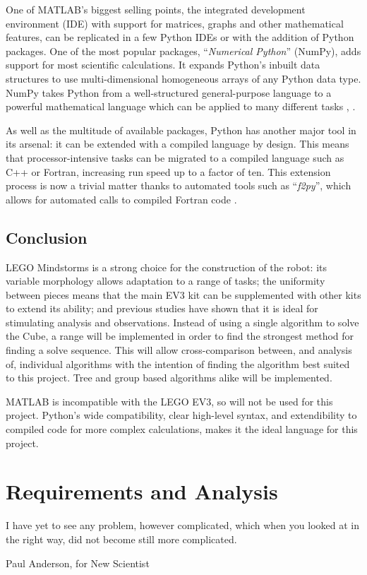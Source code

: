 \documentclass{report}
\newcommand{\tit}[1]{\textit{#1}}
\newcommand{\propernoun}[1]{\enquote{\tit{#1}}}
\newcommand{\lego}{LEGO }
\begin{document}
    One of MATLAB's biggest selling points, the integrated development environment (IDE) with support for matrices, graphs and other mathematical features, can be replicated in a few Python IDEs or with the addition of Python packages. One of the most popular packages, \propernoun{Numerical Python} (NumPy), adds support for most scientific calculations. It expands Python's inbuilt data structures to use multi-dimensional homogeneous arrays of any Python data type. NumPy takes Python from a well-structured general-purpose language to a powerful mathematical language which can be applied to many different tasks \cite{Cai2005}, \cite{Oliphant2006}.
    
    As well as the multitude of available packages, Python has another major tool in its arsenal: it can be extended with a compiled language by design. This means that processor-intensive tasks can be migrated to a compiled language such as C++ or Fortran, increasing run speed up to a factor of ten. This extension process is now a trivial matter thanks to automated tools such as \propernoun{f2py}, which allows for automated calls to compiled Fortran code \cite{Oliphant2006}.
    
    \section{Conclusion}
    \lego Mindstorms is a strong choice for the construction of the robot: its variable morphology allows adaptation to a range of tasks; the uniformity between pieces means that the main EV3 kit can be supplemented with other kits to extend its ability; and previous studies have shown that it is ideal for stimulating analysis and observations. Instead of using a single algorithm to solve the Cube, a range will be implemented in order to find the strongest method for finding a solve sequence. This will allow cross-comparison between, and analysis of, individual algorithms with the intention of finding the algorithm best suited to this project. Tree and group based algorithms alike will be implemented.
    
    MATLAB is incompatible with the \lego EV3, so will not be used for this project. Python's wide compatibility, clear high-level syntax, and extendibility to compiled code for more complex calculations, makes it the ideal language for this project.
   
    \newpage
    \chapter{Requirements and Analysis}
    \epigraph{I have yet to see any problem, however complicated, which when you looked at in the right way, did not become still more complicated.}{Paul Anderson, for New Scientist \cite{Anderson1969}}
    
\end{document}
